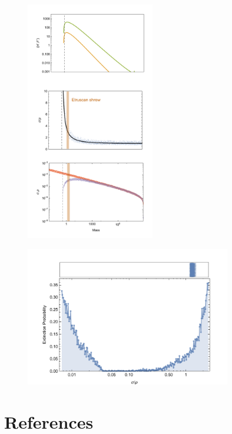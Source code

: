 \documentclass[12pt,english]{article}
\begin{document}
\begin{spacing}{1.9}
 
	\begin{figure}[h]
 	\centering
 	\includegraphics[width=0.5\textwidth]{fig_FPAllometric.pdf}
 	\caption{
 	}
 	\label{Asymp}
 \end{figure}
 
  \begin{figure}[h]
 	\centering
 	\includegraphics[width=0.8\textwidth]{fig_ExtinctionAllometric.pdf}
 	\caption{
 	}
 	\label{Ext}
 \end{figure}
 

 
%
%
%
%
%

\clearpage

\section*{References}



\end{spacing}
\end{document}
